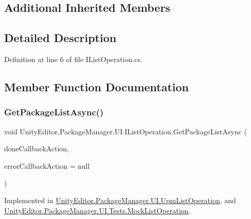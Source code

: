 \subsection*{Additional Inherited Members}


\subsection{Detailed Description}


Definition at line 6 of file I\+List\+Operation.\+cs.



\subsection{Member Function Documentation}
\mbox{\label{interface_unity_editor_1_1_package_manager_1_1_u_i_1_1_i_list_operation_af9786e05457b17b3cc3a5fdc4a5b42ae}} 
\subsubsection{\texorpdfstring{GetPackageListAsync()}{GetPackageListAsync()}}
{\footnotesize\ttfamily void Unity\+Editor.\+Package\+Manager.\+U\+I.\+I\+List\+Operation.\+Get\+Package\+List\+Async (\begin{DoxyParamCaption}\item[{Action$<$ I\+Enumerable$<$ \mbox{\hyperlink{class_unity_editor_1_1_package_manager_1_1_u_i_1_1_package_info}{Package\+Info}} $>$$>$}]{done\+Callback\+Action,  }\item[{Action$<$ \mbox{\hyperlink{namespace_unity_editor_1_1_package_manager_1_1_u_i_ab1815eb3e48074893d9dc1dc99a4a32aa902b0d55fddef6f8d651fe1035b7d4bd}{Error}} $>$}]{error\+Callback\+Action = {\ttfamily null} }\end{DoxyParamCaption})}



Implemented in \mbox{\hyperlink{class_unity_editor_1_1_package_manager_1_1_u_i_1_1_upm_list_operation_a0e8627929664d10a9c5ad1d1a328f375}{Unity\+Editor.\+Package\+Manager.\+U\+I.\+Upm\+List\+Operation}}, and \mbox{\hyperlink{class_unity_editor_1_1_package_manager_1_1_u_i_1_1_tests_1_1_mock_list_operation_aae7372d4b96be2e32932308ccf3b250b}{Unity\+Editor.\+Package\+Manager.\+U\+I.\+Tests.\+Mock\+List\+Operation}}.



